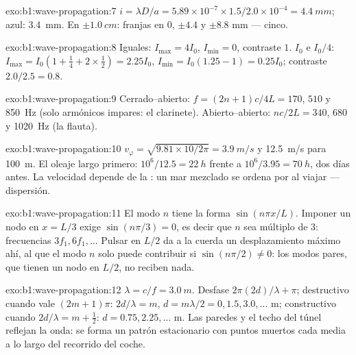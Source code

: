 \begin{solution}{exo:b1:wave-propagation:7}
$i = \lambda D/a = 5.89\times10^{-7} \times 1.5/2.0\times10^{-4} =
\qty{4.4}{mm}$; azul: \qty{3.4}{mm}. En $\pm\qty{1.0}{cm}$: franjas en
$0$, $\pm 4.4$ y $\pm 8.8$ mm --- cinco.
\end{solution}

\begin{solution}{exo:b1:wave-propagation:8}
Iguales: $I_{\max} = 4I_0$, $I_{\min} = 0$, contraste $1$. $I_0$ e $I_0/4$:
$I_{\max} = I_0(1 + \tfrac14 + 2 \times \tfrac12) = 2.25I_0$, $I_{\min} =
I_0(1.25 - 1) = 0.25I_0$; contraste $2.0/2.5 = 0.8$.
\end{solution}

\begin{solution}{exo:b1:wave-propagation:9}
Cerrado--abierto: $f = (2n + 1)c/4L = 170$, $510$ y \qty{850}{Hz} (solo
armónicos impares: el clarinete). Abierto--abierto: $nc/2L = 340$, $680$ y
\qty{1020}{Hz} (la flauta).
\end{solution}

\begin{solution}{exo:b1:wave-propagation:10}
$v_\varphi = \sqrt{9.81 \times 10/2\pi} = \qty{3.9}{m/s}$ y
\qty{12.5}{m/s} para \qty{100}{m}. El oleaje largo primero: $10^6/12.5 =
\qty{22}{h}$ frente a $10^6/3.95 = \qty{70}{h}$, dos días antes. La
velocidad depende de la : un mar mezclado se ordena por
 al viajar --- dispersión.
\end{solution}

\begin{solution}{exo:b1:wave-propagation:11}
El modo $n$ tiene la forma $\sin(n\pi x/L)$. Imponer un nodo en $x = L/3$
exige $\sin(n\pi/3) = 0$, es decir que $n$ sea múltiplo de $3$:
frecuencias $3f_1,
6f_1, \dots$ Pulsar en $L/2$ da a la cuerda un desplazamiento máximo ahí,
al que el modo $n$ solo puede contribuir si $\sin(n\pi/2) \neq 0$: los
modos pares, que tienen un nodo en $L/2$, no reciben nada.
\end{solution}

\begin{solution}{exo:b1:wave-propagation:12}
$\lambda = c/f = \qty{3.0}{m}$. Desfase $2\pi(2d)/\lambda + \pi$;
destructivo cuando vale $(2m + 1)\pi$: $2d/\lambda = m$,
$d = m\lambda/2 = 0, 1.5, 3.0, \dots$ m; constructivo cuando $2d/\lambda =
m + \tfrac12$: $d = 0.75, 2.25, \dots$ m. Las paredes y el techo del túnel
reflejan la onda: se forma un patrón estacionario con puntos muertos cada
media  a lo largo del recorrido del coche.
\end{solution}

